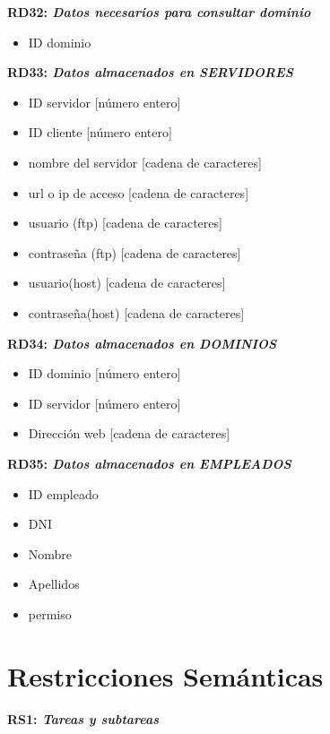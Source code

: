 \documentclass[paper=a4, fontsize=11pt, spanish]{scrartcl}
\begin{document}
\setlength{\parindent}{0em}
\textbf{RD32: \textit{Datos necesarios para consultar dominio}}
\setlength{\parindent}{2em}
\begin{itemize}
  \item ID dominio
\end{itemize}

\setlength{\parindent}{0em}
\textbf{RD33: \textit{Datos almacenados en SERVIDORES}}
\setlength{\parindent}{2em}
\begin{itemize}
  \item ID servidor [número entero]
  \item ID cliente [número entero]
  \item nombre del servidor [cadena de caracteres]
  \item url o ip de acceso [cadena de caracteres]
  \item usuario (ftp) [cadena de caracteres]
  \item contraseña (ftp) [cadena de caracteres]
  \item usuario(host) [cadena de caracteres]
  \item contraseña(host) [cadena de caracteres]
\end{itemize}

\setlength{\parindent}{0em}
\textbf{RD34: \textit{Datos almacenados en DOMINIOS}}
\setlength{\parindent}{2em}
\begin{itemize}
  \item ID dominio [número entero]
  \item ID servidor [número entero]
  \item Dirección web [cadena de caracteres]
\end{itemize}

\setlength{\parindent}{0em}
\textbf{RD35: \textit{Datos almacenados en EMPLEADOS}}
\setlength{\parindent}{2em}
\begin{itemize}
  \item ID empleado
  \item DNI
  \item Nombre
  \item Apellidos
  \item permiso
\end{itemize}

\section{Restricciones Semánticas}
\setlength{\parindent}{0em}
\textbf{RS1: \textit{Tareas y subtareas}}
\setlength{\parindent}{2em}
\end{document}
